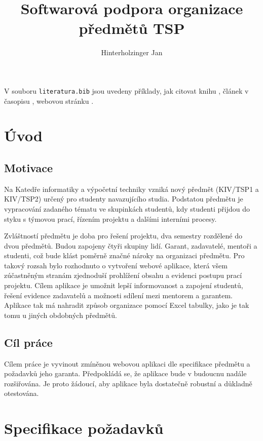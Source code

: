 \documentclass[czech,BP]{thesiskiv}
\author{Hinterholzinger Jan}
\title{Softwarová podpora organizace předmětů TSP}
\begin{document}
%
\maketitle
\tableofcontents

V souboru \texttt{literatura.bib} jsou uvedeny příklady, jak citovat knihu \cite{KnuthAOCP2}, článek v časopisu \cite{Hoare1961}, webovou stránku \cite{Graphics2D}.
\chapter{Úvod}
\section{Motivace}
	\par Na Katedře informatiky a výpočetní techniky vzniká nový předmět  (KIV/TSP1 a KIV/TSP2) určený pro studenty navazujícího studia. Podstatou předmětu je vypracování zadaného tématu ve skupinkách studentů, kdy studenti přijdou do styku s týmovou prací, řízením projektu a dalšími interními procesy.
	\par Zvláštností předmětu je doba pro řešení projektu, dva semestry rozdělené do dvou předmětů. Budou zapojeny čtyři skupiny lidí. Garant, zadavatelé, mentoři a studenti, což bude klást poměrně značné nároky na organizaci předmětu. Pro takový rozsah bylo rozhodnuto o vytvoření webové aplikace, která všem zúčastněným stranám zjednoduší prohlížení obsahu a evidenci postupu prací projektu. Cílem aplikace je umožnit lepší informovanost a zapojení studentů, řešení evidence zadavatelů a možnosti sdílení mezi mentorem a garantem. Aplikace tak má nahradit způsob organizace pomocí Excel tabulky, jako je tak tomu u jiných obdobných předmětů.
\section{Cíl práce}
	\par Cílem práce je vyvinout zmíněnou webovou aplikaci dle specifikace předmětu a požadavků jeho garanta. Předpokládá se, že aplikace bude v budoucnu nadále rozšiřována. Je proto žádoucí, aby aplikace byla dostatečně robustní a důkladně otestována.
\chapter{Specifikace požadavků}
\end{document}
